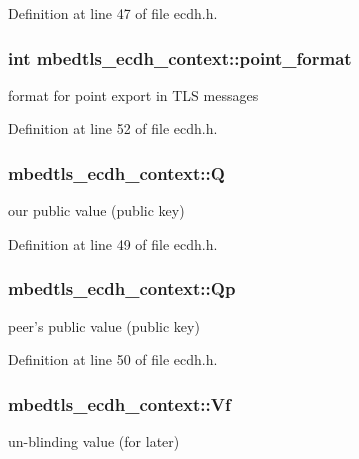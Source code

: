 Definition at line 47 of file ecdh.\-h.

\hypertarget{structmbedtls__ecdh__context_ae7ae7b0231e898b0d973df360aea8f17}{
\subsubsection[{point\-\_\-format}]{\setlength{\rightskip}{0pt plus 5cm}int mbedtls\-\_\-ecdh\-\_\-context\-::point\-\_\-format}}\label{structmbedtls__ecdh__context_ae7ae7b0231e898b0d973df360aea8f17}
format for point export in T\-L\-S messages 

Definition at line 52 of file ecdh.\-h.

\hypertarget{structmbedtls__ecdh__context_af2657e12e87be5b3e73bcf1ea2941d0b}{
\subsubsection[{Q}]{ mbedtls\-\_\-ecdh\-\_\-context\-::\-Q}}\label{structmbedtls__ecdh__context_af2657e12e87be5b3e73bcf1ea2941d0b}
our public value (public key) 

Definition at line 49 of file ecdh.\-h.

\hypertarget{structmbedtls__ecdh__context_a64ecde7d95dcc725d6af5f8e3ce542ca}{
\subsubsection[{Qp}]{ mbedtls\-\_\-ecdh\-\_\-context\-::\-Qp}}\label{structmbedtls__ecdh__context_a64ecde7d95dcc725d6af5f8e3ce542ca}
peer's public value (public key) 

Definition at line 50 of file ecdh.\-h.

\hypertarget{structmbedtls__ecdh__context_a2ee12052791b2f212047a16b4e0dcc77}{
\subsubsection[{Vf}]{ mbedtls\-\_\-ecdh\-\_\-context\-::\-Vf}}\label{structmbedtls__ecdh__context_a2ee12052791b2f212047a16b4e0dcc77}
un-\/blinding value (for later) 

